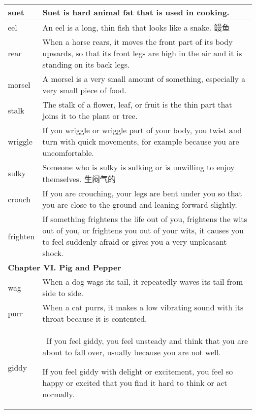 \documentclass{article}
\begin{document}
\begin{center}
\begin{longtable}{|l|p{9cm}|}
\hline
suet
&
Suet is hard animal fat that is used in cooking.
\\


\hline
eel
&
An eel is a long, thin fish that looks like a snake. 鳗鱼
\\

\hline
rear
&
When a horse rears, it moves the front part of its body upwards, so that its front legs are high in the air and it is standing on its back legs.
\\

\hline
morsel
&
A morsel is a very small amount of something, especially a very small piece of food.
\\

\hline
stalk
&
The stalk of a flower, leaf, or fruit is the thin part that joins it to the plant or tree.
\\

\hline
wriggle
&
If you wriggle or wriggle part of your body, you twist and turn with quick movements, for example because you are uncomfortable.
\\

\hline
sulky
&
Someone who is sulky is sulking or is unwilling to enjoy themselves. 生闷气的
\\

\hline
crouch
&
If you are crouching, your legs are bent under you so that you are close to the ground and leaning forward slightly.
\\

\hline
frighten
&
If something frightens the life out of you, frightens the wits out of you, or frightens you out of your wits, it causes you to feel suddenly afraid or gives you a very unpleasant shock.
\\

\hline
\multicolumn{2}{|l|}{\textbf{Chapter VI. Pig and Pepper}}\\

\hline
wag
&
When a dog wags its tail, it repeatedly waves its tail from side to side.
\\

\hline
purr
&
When a cat purrs, it makes a low vibrating sound with its throat because it is contented.
\\

\hline
giddy
&\
If you feel giddy, you feel unsteady and think that you are about to fall over, usually because you are not well.
\par
If you feel giddy with delight or excitement, you feel so happy or excited that you find it hard to think or act normally.
\\


\end{longtable}
\end{center}
\end{document}
